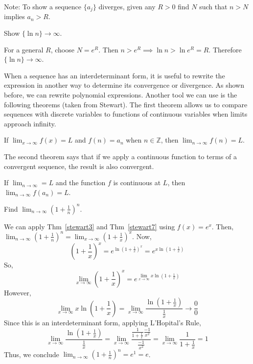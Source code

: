 \documentclass[../main.tex]{subfiles}
\begin{document}
Note: To show a sequence \( \{ a_j \} \) diverges, given any \( R>0 \)
find \( N \) such that \( n > N  \) implies \( a_n > R \).

\begin{example}[]
    Show \( \{\ln n\} \to \infty \).

    For a general \( R \), choose \( N = e^R \).
    Then \( n > e^R \implies \ln n > \ln e^R = R \).
    Therefore \( \{ \ln n \} \to \infty \).
\end{example}

When a sequence has an interdeterminant form, it is useful to rewrite the expression in another way to determine its convergence or divergence.
As shown before, we can rewrite polynomial expressions. Another tool we can use is the following theorems (taken from Stewart).
The first theorem allows us to compare sequences with discrete variables to functions of continuous variables when limits approach infinity. 
\begin{theorem}
    \label{stewart3}
    If \( \lim_{x \to \infty} f(x) = L  \) and \( f(n) = a_n \) when \( n \in \mathbb{Z} \), then \( \lim_{n \to \infty} f(n) = L \).
\end{theorem}
The second theorem says that if we apply a continuous function to terms of a convergent sequence, the result is also convergent.
\begin{theorem}
    \label{stewart7}
    If \( \lim_{n \to \infty} = L \) and the function \( f \) is continuous at \( L \), then \( \lim_{n \to \infty} f(a_n) = L \).
\end{theorem}

\begin{example}[]
    Find \( \lim_{n \to \infty} (1+\frac{1}{n})^n \).

    We can apply Thm~\ref{stewart3} and Thm~\ref{stewart7} using \( f(x) = e^x \).
    Then, \( \lim_{n \to \infty} (1+\frac{1}{n})^n = \lim_{x \to \infty} (1+\frac{1}{x})^x \). Now,
    \[ \left( 1+\frac{1}{x} \right)^x = e^{\ln \left( 1+\frac{1}{x} \right)^x } = e^{x \ln \left( 1+\frac{1}{x} \right)} \]
    So, \[ \lim_{x \to \infty} \left(1+\frac{1}{x}\right)^x = e^{ \lim_{x \to \infty} x \ln \left( 1+\frac{1}{x} \right)} \]
    However, \[ \lim_{x \to \infty} x \ln \left( 1+\frac{1}{x} \right) = \lim_{x \to \infty} \frac{\ln \left( 1+\frac{1}{x} \right)}{\frac{1}{x}} \to \frac{0}{0} \]
    Since this is an interdeterminant form, applying L'Hopital's Rule,
    \[ \lim_{x \to \infty} \frac{ \ln\left(1+ \frac{1}{x}\right) }{ \frac{1}{x} } = \lim_{x \to \infty} \frac{\frac{1}{1+\frac{1}{x}}\frac{-1}{x^2}}{\frac{-1}{x^2}}
        = \lim_{x \to \infty} \frac{1}{1+\frac{1}{x}} = 1\]
    Thus, we conclude \( \lim_{n \to \infty} \left( 1 + \frac{1}{n}\right)^n = e^1 = e \).
\end{example}
\end{document}
